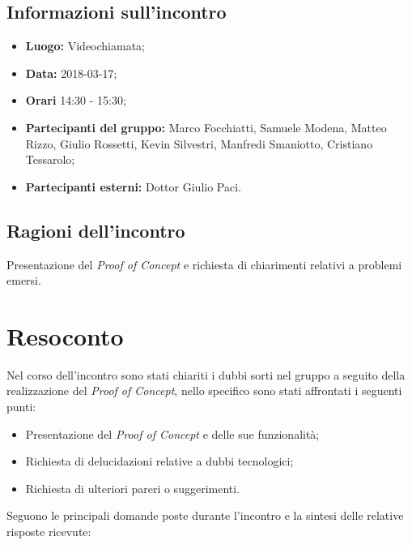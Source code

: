 \documentclass[openany,12pt,a4paper]{article}
\begin{document}
  \subsection{Informazioni sull'incontro} 
   
  \begin{itemize}  
      \item \textbf{Luogo:} Videochiamata;
      \item \textbf{Data:} 2018-03-17; 
      \item \textbf{Orari} 14:30 - 15:30;
      \item \textbf{Partecipanti del gruppo:} Marco Focchiatti, Samuele Modena, Matteo Rizzo, Giulio Rossetti, Kevin Silvestri, Manfredi Smaniotto, Cristiano Tessarolo; 
      \item \textbf{Partecipanti esterni:} Dottor Giulio Paci. 
  \end{itemize} 
 
  \subsection{Ragioni dell'incontro} 
  Presentazione del \textit{Proof of Concept} e richiesta di chiarimenti relativi a problemi emersi. 
 
  \section{Resoconto} 
  Nel corso dell'incontro sono stati chiariti i dubbi sorti nel gruppo a seguito della realizzazione del \textit{Proof of Concept}, nello specifico sono stati affrontati i seguenti punti:
	
  \begin{itemize}
	\item Presentazione del \textit{Proof of Concept} e delle sue funzionalità;
	\item Richiesta di delucidazioni relative a dubbi tecnologici;
	\item Richiesta di ulteriori pareri o suggerimenti.
  \end{itemize}
	
  \noindent Seguono le principali domande poste durante l'incontro e la sintesi delle relative risposte ricevute:
\end{document}
